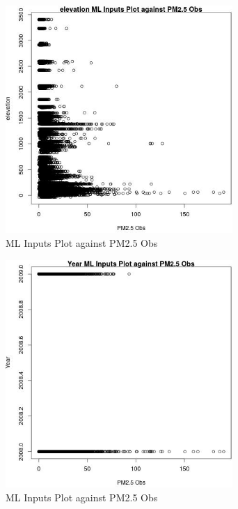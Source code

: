 \begin{figure} 
\centering  
\includegraphics[width=0.77\textwidth]{Code_Outputs/Report_ML_input_PM25_Step4_part_e_de_duplicated_aves_elevationvPM25_Obs.jpg} 
\caption{\label{fig:Report_ML_input_PM25_Step4_part_e_de_duplicated_aveselevationvPM25_Obs}ML Inputs Plot against PM2.5 Obs} 
\end{figure} 
 

\begin{figure} 
\centering  
\includegraphics[width=0.77\textwidth]{Code_Outputs/Report_ML_input_PM25_Step4_part_e_de_duplicated_aves_YearvPM25_Obs.jpg} 
\caption{\label{fig:Report_ML_input_PM25_Step4_part_e_de_duplicated_avesYearvPM25_Obs}ML Inputs Plot against PM2.5 Obs} 
\end{figure} 
 

